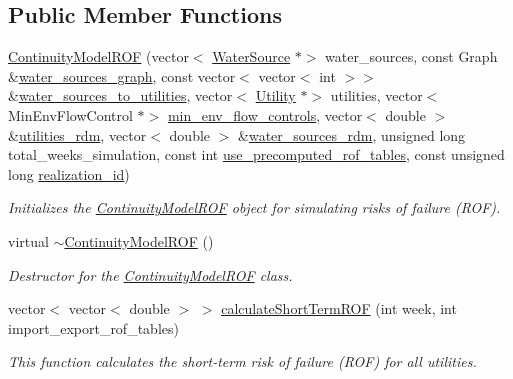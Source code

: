 \subsection*{Public Member Functions}
\begin{DoxyCompactItemize}
\item 
\mbox{\hyperlink{classContinuityModelROF_a23bd422349e4e2246bd44b2007564fd1}{Continuity\+Model\+R\+OF}} (vector$<$ \mbox{\hyperlink{classWaterSource}{Water\+Source}} $\ast$$>$ water\+\_\+sources, const Graph \&\mbox{\hyperlink{classContinuityModel_a563401588c6fa622f03393909a3522db}{water\+\_\+sources\+\_\+graph}}, const vector$<$ vector$<$ int $>$$>$ \&\mbox{\hyperlink{classContinuityModel_ae8516bcbbf52650190277fc8b06c1843}{water\+\_\+sources\+\_\+to\+\_\+utilities}}, vector$<$ \mbox{\hyperlink{classUtility}{Utility}} $\ast$$>$ utilities, vector$<$ Min\+Env\+Flow\+Control $\ast$$>$ \mbox{\hyperlink{classContinuityModel_afc991e5c0d144020e49a97751a04b302}{min\+\_\+env\+\_\+flow\+\_\+controls}}, vector$<$ double $>$ \&\mbox{\hyperlink{classContinuityModel_aa4a00b76da6295d2faa11e3dcaea1896}{utilities\+\_\+rdm}}, vector$<$ double $>$ \&\mbox{\hyperlink{classContinuityModel_ab7b8fa93a6f56b328e425e1ead6cfefa}{water\+\_\+sources\+\_\+rdm}}, unsigned long total\+\_\+weeks\+\_\+simulation, const int \mbox{\hyperlink{classContinuityModelROF_a384967647c98d9768400de07e2bc7dab}{use\+\_\+precomputed\+\_\+rof\+\_\+tables}}, const unsigned long \mbox{\hyperlink{classContinuityModel_a7b6c99bf256f6c6b633ebb78282f43c7}{realization\+\_\+id}})
\begin{DoxyCompactList}\small\item\em Initializes the \mbox{\hyperlink{classContinuityModelROF}{Continuity\+Model\+R\+OF}} object for simulating risks of failure (R\+OF). \end{DoxyCompactList}\item 
virtual \mbox{\hyperlink{classContinuityModelROF_a4acab850e28a3a41182a19d86a7de709}{$\sim$\+Continuity\+Model\+R\+OF}} ()
\begin{DoxyCompactList}\small\item\em Destructor for the \mbox{\hyperlink{classContinuityModelROF}{Continuity\+Model\+R\+OF}} class. \end{DoxyCompactList}\item 
vector$<$ vector$<$ double $>$ $>$ \mbox{\hyperlink{classContinuityModelROF_a0386963b5914aaaa145de60a2ff1f84e}{calculate\+Short\+Term\+R\+OF}} (int week, int import\+\_\+export\+\_\+rof\+\_\+tables)
\begin{DoxyCompactList}\small\item\em This function calculates the short-\/term risk of failure (R\+OF) for all utilities. \end{DoxyCompactList}\item 

\end{DoxyCompactItemize}
